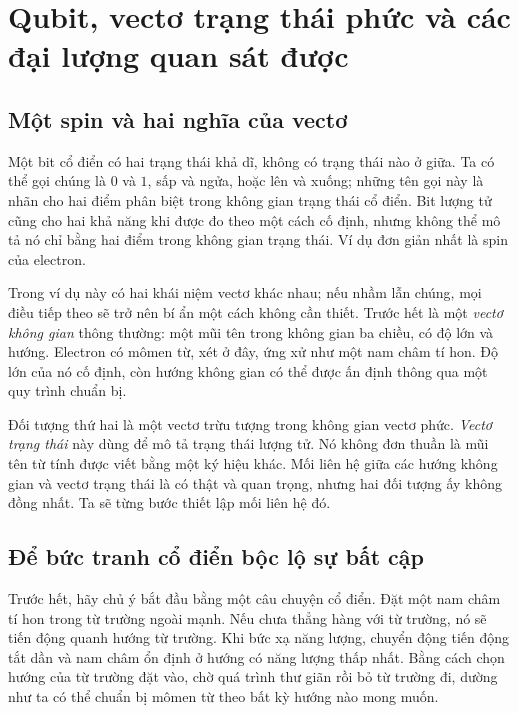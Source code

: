 \chapter{Qubit, vectơ trạng thái phức và các đại lượng quan sát được}


\section{Một spin và hai nghĩa của vectơ}

Một bit cổ điển có hai trạng thái khả dĩ, không có trạng thái nào ở giữa. Ta có thể gọi chúng là \(0\) và \(1\), sấp và ngửa, hoặc lên và xuống; những tên gọi này là nhãn cho hai điểm phân biệt trong không gian trạng thái cổ điển. Bit lượng tử cũng cho hai khả năng khi được đo theo một cách cố định, nhưng không thể mô tả nó chỉ bằng hai điểm trong không gian trạng thái. Ví dụ đơn giản nhất là spin của electron.

Trong ví dụ này có hai khái niệm vectơ khác nhau; nếu nhầm lẫn chúng, mọi điều tiếp theo sẽ trở nên bí ẩn một cách không cần thiết. Trước hết là một \emph{vectơ không gian} thông thường: một mũi tên trong không gian ba chiều, có độ lớn và hướng. Electron có mômen từ, xét ở đây, ứng xử như một nam châm tí hon. Độ lớn của nó cố định, còn hướng không gian có thể được ấn định thông qua một quy trình chuẩn bị.

Đối tượng thứ hai là một vectơ trừu tượng trong không gian vectơ phức. \emph{Vectơ trạng thái} này dùng để mô tả trạng thái lượng tử. Nó không đơn thuần là mũi tên từ tính được viết bằng một ký hiệu khác. Mối liên hệ giữa các hướng không gian và vectơ trạng thái là có thật và quan trọng, nhưng hai đối tượng ấy không đồng nhất. Ta sẽ từng bước thiết lập mối liên hệ đó.

\section{Để bức tranh cổ điển bộc lộ sự bất cập}

Trước hết, hãy chủ ý bắt đầu bằng một câu chuyện cổ điển. Đặt một nam châm tí hon trong từ trường ngoài mạnh. Nếu chưa thẳng hàng với từ trường, nó sẽ tiến động quanh hướng từ trường. Khi bức xạ năng lượng, chuyển động tiến động tắt dần và nam châm ổn định ở hướng có năng lượng thấp nhất. Bằng cách chọn hướng của từ trường đặt vào, chờ quá trình thư giãn rồi bỏ từ trường đi, dường như ta có thể chuẩn bị mômen từ theo bất kỳ hướng nào mong muốn.

